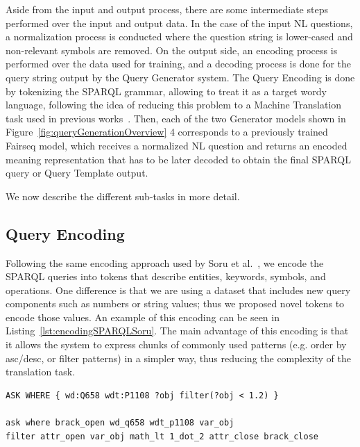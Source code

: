 Aside from the input and output process, there are some intermediate steps performed over the 
input and output data. In the case of the input NL questions, a normalization process is 
conducted where the question string is lower-cased and non-relevant symbols are removed. On 
the output side, an encoding process is performed over the data used for training, and a 
decoding process is done for the query string output by the Query Generator system. The Query 
Encoding is done by tokenizing the SPARQL grammar, allowing to treat it as a target wordy 
language, following the idea of reducing this problem to a Machine Translation task used in 
previous works~\cite{semPar:ChoMGBBSB14, semPar:sempar-as-mt-AndreasVC13, nmt:nl-to-sparql-Yin19}. 
Then, each of the two Generator models shown in Figure~\ref{fig:queryGenerationOverview} 4 
corresponds to a previously trained Fairseq model, which receives a normalized NL question 
and returns an encoded meaning representation that has to be later decoded to obtain the 
final SPARQL query or Query Template output.

We now describe the different sub-tasks in more detail.

\subsection{Query Encoding}
Following the same encoding approach used by Soru et al.~\cite{nmt:nspm-SoruMMPVEN17}, we 
encode the SPARQL queries into tokens that describe entities, keywords, symbols, and 
operations. One difference is that we are using a dataset that includes new query components 
such as numbers or string values; thus we proposed novel tokens to encode those values. An 
example of this encoding can be seen in Listing~\ref{lst:encodingSPARQLSoru}. The main advantage of 
this encoding is that it allows the system to express chunks of commonly used patterns (e.g. 
order by asc/desc, or filter patterns) in a simpler way, thus reducing the complexity of the 
translation task.

\begin{lstlisting}[captionpos=b, 
    caption=SPARQL query example with its encoded form., 
    label=lst:encodingSPARQLSoru,
    basicstyle=\ttfamily,frame=single]
ASK WHERE { wd:Q658 wdt:P1108 ?obj filter(?obj < 1.2) }

ask where brack_open wd_q658 wdt_p1108 var_obj 
filter attr_open var_obj math_lt 1_dot_2 attr_close brack_close
\end{lstlisting}

